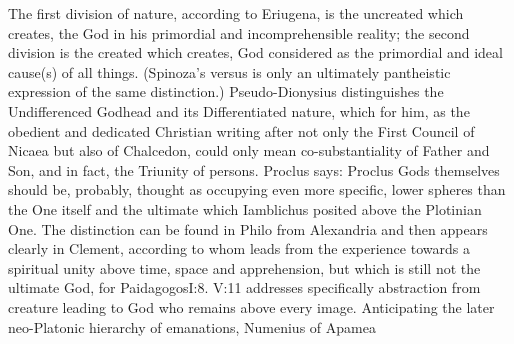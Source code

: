  The first division
  of nature, 
according to Eriugena, is the uncreated which creates, the God in his primordial
and incomprehensible reality; the second division is the created which creates,
God considered as the primordial and ideal cause(s) of all things. (Spinoza's
 versus  is only an ultimately
pantheistic expression of the same distinction.)  Pseudo-Dionysius distinguishes
the Undifferenced Godhead and its Differentiated
nature, which for him, as the obedient and
dedicated Christian writing after not only the First Council of Nicaea but also
of Chalcedon, could only mean co-substantiality of Father and Son, and in fact,
the Triunity of persons. Proclus says: \citet{It is thanks to beings with which
  they are conjoined that all gods receive names, and hence thanks to these
  beings knowledge of various subsistences of these gods is possible, though in
  themselves they are unknowable.}{Proclus}{} Gods themselves should
be, probably, thought as occupying even more specific, lower spheres than the
One itself and the ultimate  which Iamblichus posited
above the Plotinian One. The distinction can be found in Philo from
Alexandria  and
then appears clearly in Clement, according to whom  leads
from the experience towards a spiritual unity above time, space and
apprehension, but which is still not the ultimate God, for \citet{God is one,
  and beyond the one and above the Monad itself.}{Paidagogos}{I:8.  {V:11} addresses specifically
  abstraction from creature leading to God who remains above every image.}
Anticipating the later neo-Platonic hierarchy of emanations, Numenius of Apamea
